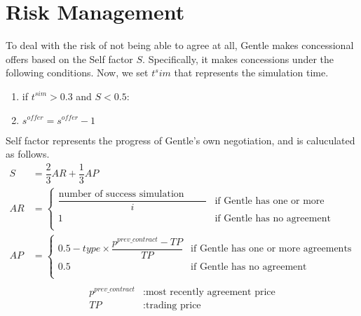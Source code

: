 \documentclass[uplatex, 10pt, a4j]{jsarticle}
\begin{document}
\section{\textrm{Risk Management}}
To deal with the risk of not being able to agree at all, Gentle makes concessional offers based on the Self factor $S$.
Specifically, it makes concessions under the following conditions. Now, we set $t^sim$ that represents the simulation time.
\begin{enumerate}[\hspace{20mm}1\textrm{:}]
    \item \hspace{10mm} if $t^{sim}>0.3$ and $S<0.5$:
    \item \hspace{10mm} \qquad $s^{offer} = s^{offer} - 1$
\end{enumerate}
Self factor represents the progress of Gentle's own negotiation, and is caluculated as follows.
\begin{equation*}
    \begin{split}
        S &= \dfrac{2}{3}AR + \dfrac{1}{3}AP \\
        AR &= \left\{\begin{array}{ll}
            \dfrac{\text{number of success simulation steps}}{i} & \text{if Gentle has one or more agreements} \\
            1                                                    & \text{if Gentle has no agreement}           \\
        \end{array}\right. \\
        AP &= \left\{\begin{array}{ll}
            0.5 - type \times \dfrac{p^{prev\_contract}-TP}{TP} & \text{if Gentle has one or more agreements} \\
            0.5                                                            & \text{if Gentle has no agreement}           \\
        \end{array}\right. \\
    \end{split}
\end{equation*}
\begin{equation*}
    \begin{split}
        p^{prev\_contract} &: \text{most recently agreement price} \\
        TP &: \text{trading price} \\
    \end{split}
\end{equation*}
\end{document}
